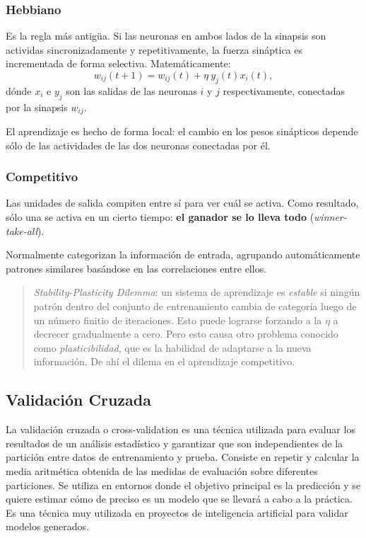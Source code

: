 \documentclass[10pt,a4paper]{article}
\begin{document}
\subsubsection{Hebbiano}
Es la regla más antigüa. Si las neuronas en ambos lados de la sinapsis son actividas sincronizadamente y repetitivamente, la fuerza sináptica es incrementada de forma selectiva. Matemáticamente:
\[w_{ij}(t+1) = w_{ij}(t) + \eta \: y_j(t)x_i(t),\]
dónde $x_i$ e $y_j$ son las salidas de las neuronas $i$ y $j$ respectivamente, conectadas por la sinapsis $w_{ij}$.

El aprendizaje es hecho de forma local: el cambio en los pesos sinápticos depende sólo de las actividades de las dos neuronas conectadas por él.

\subsubsection{Competitivo}
Las unidades de salida compiten entre sí para ver cuál se activa. Como resultado, sólo una se activa en un cierto tiempo: \textbf{el ganador se lo lleva todo} (\textit{winner-take-all}). 

Normalmente categorizan la información de entrada, agrupando automáticamente patrones similares basándose en las correlaciones entre ellos.

\begin{quotation}
\textit{Stability-Plasticity Dilemma}: un sistema de aprendizaje es \textit{estable} si ningún patrón dentro del conjunto de entrenamiento cambia de categoría luego de un número finitio de iteraciones. Esto puede lograrse forzando a la $\eta$ a decrecer gradualmente a cero. Pero esto causa otro problema conocido como \textit{plasticibilidad}, que es la habilidad de adaptarse a la nueva información. De ahí el dilema en el aprendizaje competitivo.
\end{quotation}

\subsection{Validación Cruzada}

La validación cruzada o cross-validation es una técnica utilizada para evaluar los resultados de un análisis estadístico y garantizar que son independientes de la partición entre datos de entrenamiento y prueba. Consiste en repetir y calcular la media aritmética obtenida de las medidas de evaluación sobre diferentes particiones. Se utiliza en entornos donde el objetivo principal es la predicción y se quiere estimar cómo de preciso es un modelo que se llevará a cabo a la práctica. Es una técnica muy utilizada en proyectos de inteligencia artificial para validar modelos generados.
\end{document}
